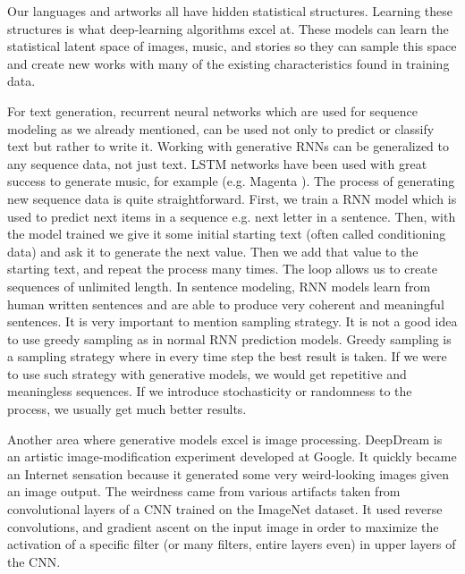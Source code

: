 \documentclass[b5paper]{book}
\let\cite\parencite
\begin{document}
Our languages and artworks all have hidden statistical structures. Learning these structures is what deep-learning algorithms excel at. These models can learn the statistical latent space of images, music, and stories so they can sample this space and create new works with many of the existing characteristics found in training data.

For text generation, recurrent neural networks which are used for sequence modeling as we already mentioned, can be used not only to predict or classify text but rather to write it. Working with generative RNNs can be generalized to any sequence data, not just text. LSTM networks have been used with great success to generate music, for example (e.g. Magenta \cite{roberts2018magenta}). The process of generating new sequence data is quite straightforward. First, we train a RNN model which is used to predict next items in a sequence e.g. next letter in a sentence. Then, with the model trained we give it some initial starting text (often called conditioning data) and ask it to generate the next value. Then we add that value to the starting text, and repeat the process many times. The loop allows us to create sequences of unlimited length. In sentence modeling, RNN models learn from human written sentences and are able to produce very coherent and meaningful sentences. It is very important to mention sampling strategy. It is not a good idea to use greedy sampling as in normal RNN prediction models. Greedy sampling is a sampling strategy where in every time step the best result is taken. If we were to use such strategy with generative models, we would get repetitive and meaningless sequences. If we introduce stochasticity or randomness to the process, we usually get much better results.

Another area where generative models excel is image processing. DeepDream \cite{mordvintsev2015inceptionism} is an artistic image-modification experiment developed at Google. It quickly became an Internet sensation because it generated some very weird-looking images given an image output. The weirdness came from various artifacts taken from convolutional layers of a CNN trained on the ImageNet dataset. It used reverse convolutions, and gradient ascent on the input image in order to maximize the activation of a specific filter (or many filters, entire layers even) in upper layers of the CNN.
\end{document}
